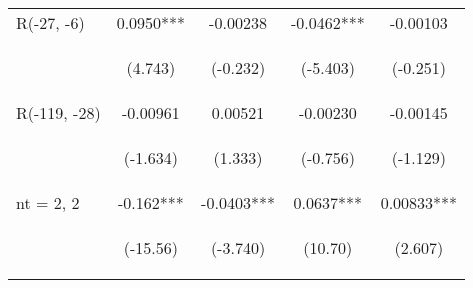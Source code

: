 \documentclass[]{standalone}
\begin{document}
\begin{tabular}{lcccc}
    R(-27, -6)       & 0.0950***                                      & -0.00238                                       & -0.0462***                                     & -0.00103                                       \\
    \vspace{4pt}     & \begin{footnotesize}(4.743)\end{footnotesize}  & \begin{footnotesize}(-0.232)\end{footnotesize} & \begin{footnotesize}(-5.403)\end{footnotesize} & \begin{footnotesize}(-0.251)\end{footnotesize} \\
    R(-119, -28)     & -0.00961                                       & 0.00521                                        & -0.00230                                       & -0.00145                                       \\
    \vspace{4pt}     & \begin{footnotesize}(-1.634)\end{footnotesize} & \begin{footnotesize}(1.333)\end{footnotesize}  & \begin{footnotesize}(-0.756)\end{footnotesize} & \begin{footnotesize}(-1.129)\end{footnotesize} \\
    nt = 2, 2        & -0.162***                                      & -0.0403***                                     & 0.0637***                                      & 0.00833***                                     \\
    \vspace{4pt}     & \begin{footnotesize}(-15.56)\end{footnotesize} & \begin{footnotesize}(-3.740)\end{footnotesize} & \begin{footnotesize}(10.70)\end{footnotesize}  & \begin{footnotesize}(2.607)\end{footnotesize}  \\

\end{tabular}
\end{document}
